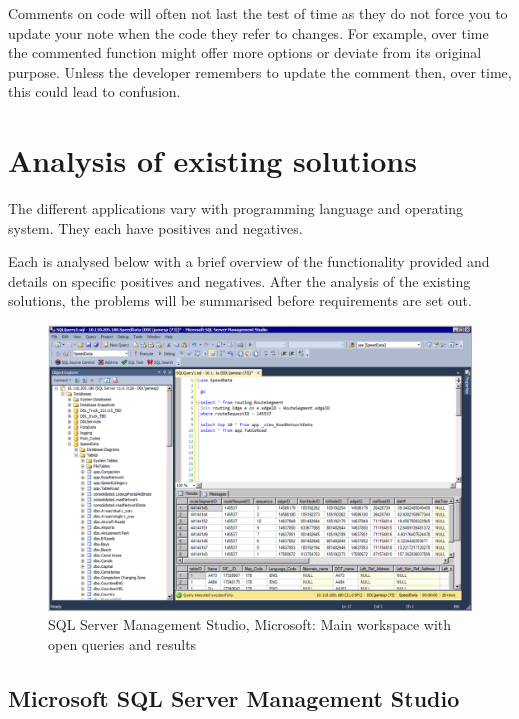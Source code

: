 Comments on code will often not last the test of time as they do not force you to
update your note when the code they refer to changes. For example, over time the
commented function might offer more options or deviate from its original
purpose. Unless the developer remembers to update the comment then, over time, this could lead to confusion.

\section{Analysis of existing solutions}\label{analysis-of-existing-solutions}

The different applications vary with programming language and
operating system. They each have positives and negatives.

Each is analysed below with a brief overview of the functionality provided and
details on specific positives and negatives. After the analysis of the existing
solutions, the problems will be summarised before requirements are set out.


\begin{figure}
  \includegraphics[width=\linewidth]{Figures/SSMS.png}
  \caption{SQL Server Management Studio, Microsoft: Main workspace with open queries and results}
  \label{fig:ssms}
\end{figure}

\subsection{Microsoft SQL Server Management Studio}\label{microsoft-sql-server-management-studio}

